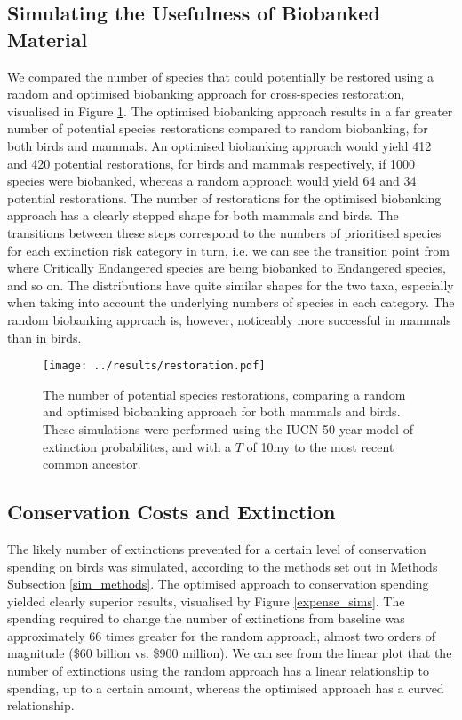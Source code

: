 \documentclass[12pt]{article}
\begin{document}
	\subsection{Simulating the Usefulness of Biobanked Material}
	We compared the number of species that could potentially be restored using
	a random and optimised biobanking approach for cross-species restoration,
	visualised in Figure \ref{rest_sims}. The optimised biobanking approach
	results in a far greater number of potential species restorations
	compared to random biobanking, for both birds and mammals. An optimised
	biobanking approach would yield 412 and 420 potential restorations, for
	birds and mammals respectively, if 1000 species were biobanked, whereas
	a random approach would yield 64 and 34 potential restorations. The number
	of restorations for the optimised biobanking approach has a clearly stepped
	shape for both mammals and birds. The transitions between these steps
	correspond to the numbers of prioritised species for each extinction risk
	category in turn, i.e. we can see the transition point from where Critically
	Endangered species are being biobanked to Endangered species, and so on.
	The distributions have quite similar shapes for the two taxa, especially
	when taking into account the underlying numbers of species in each category.
	The random biobanking approach is, however, noticeably more successful in mammals
	than in birds.
	
	\begin{figure}
		\texttt{[image: ../results/restoration.pdf]}
		\caption{The number of potential species restorations, comparing
		a random and optimised biobanking approach for both mammals and birds.
		These simulations were performed using the IUCN 50 year model of
		extinction probabilites, and with a $T$ of 10my to the most recent
		common ancestor.}\label{rest_sims}
	\end{figure}

	
	\subsection{Conservation Costs and Extinction}
	The likely number of extinctions prevented for a certain level of
	conservation spending on birds was simulated, according to the
	methods set out in Methods Subsection \ref{sim_methods}. The optimised
	approach to conservation spending yielded clearly superior results,
	visualised by Figure \ref{expense_sims}. The spending required to
	change the number of extinctions from baseline was approximately
	66 times greater for the random approach, almost two orders of
	magnitude (\$60 billion vs. \$900 million). We can see from the
	linear plot that the number of extinctions using the random approach
	has a linear relationship to spending, up to a certain amount, whereas
	the optimised approach has a curved relationship.
	
\end{document}
